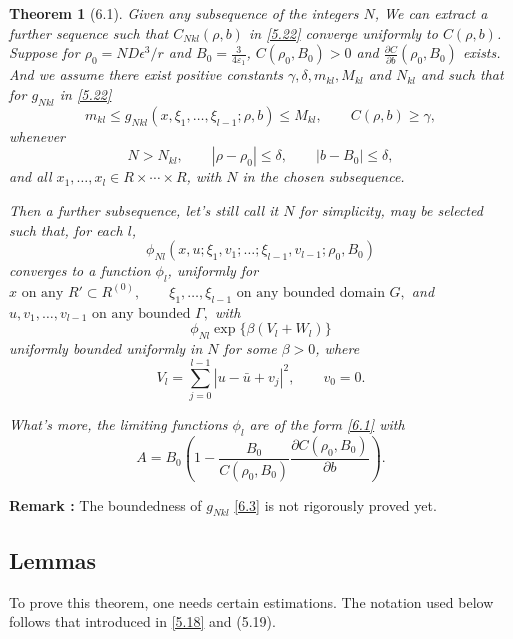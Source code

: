 \documentclass[11pt]{article}
\newtheorem{theorem}{Theorem}
\begin{document}
\begin{theorem}[6.1]\label{Thm:limit}
Given any subsequence of the integers $N$, We can extract a further sequence such that $C_{Nkl}(\rho,b)$ in \eqref{5.22} converge uniformly to $C(\rho,b)$. Suppose for $\rho_0=ND\epsilon^3/r$ and $B_0=\frac{3}{4\varepsilon_1}$, $C(\rho_0,B_0)>0$ and $\frac{\partial C}{\partial b}(\rho_0,B_0)$ exists. And we assume there exist positive constants $\gamma,\delta,m_{kl},M_{kl}$ and $N_{kl}$ and such that for $g_{Nkl}$ in \eqref{5.22}
\begin{equation}
m_{kl} 
\le 
g_{N kl}(x,\xi_1,\ldots,\xi_{l-1};\rho,b)
\le 
M_{kl},
\qquad 
C(\rho,b)\ge \gamma ,
\tag{6.3}\label{6.3}
\end{equation}
whenever
\[
N>N_{kl}, 
\qquad 
|\rho-\rho_0|\le \delta,
\qquad 
|b-B_0|\le \delta,
\]
and all $x_1,\ldots,x_l \in R\times\cdots\times R$, with $N$ in the chosen subsequence.

Then a further subsequence, let's still call it $N$ for simplicity, may be selected such that, for each $l$,
\[
\phi_{Nl}(x,u;\xi_1,v_1;\ldots;\xi_{l-1},v_{l-1};\rho_0,B_0)
\]
converges to a function $\phi_l$, uniformly for
$
x \text{ on any } R' \subset R^{(0)}, \qquad
\xi_1,\ldots,\xi_{l-1} \text{ on any bounded domain } G,
$ and $
u,v_1,\ldots,v_{l-1} \text{ on any bounded } \Gamma,
$
with
\begin{equation}
\phi_{Nl}\exp\{\beta(V_l+W_l)\}
\tag{6.4}\label{6.4}
\end{equation}
uniformly bounded uniformly in $N$ for some $\beta>0$, where
\[
V_l=\sum_{j=0}^{l-1}|u-\bar u+v_j|^2,
\qquad
v_0=0 .
\]

What's more, the limiting functions $\phi_l$ are of the form \eqref{6.1} with
\begin{equation}
A = B_0\left(1 - \frac{B_0}{C(\rho_0,B_0)}\frac{\partial C(\rho_0,B_0)}{\partial b}\right).
\tag{6.5}\label{6.5}
\end{equation}
\end{theorem}
\textbf{Remark :} The boundedness of $g_{Nkl}$ \eqref{6.3} is not rigorously proved yet.


\subsection{Lemmas}
To prove this theorem, one needs certain estimations. The notation used below follows that introduced in \eqref{5.18} and (5.19).
\end{document}
